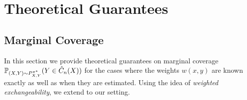 

\section{Theoretical Guarantees}\label{sec:theory}
\subsection{Marginal Coverage}

In this section we provide theoretical guarantees on marginal coverage $\mathbb{P}_{(X,Y)\sim P^{\pi^*}_{X,Y}}(Y \in \hat{C}_n(X))$ for the cases where the weights $w(x, y)$ are known exactly as well as when they are estimated. Using the idea of \textit{weighted exchangeability}, we extend \cite[Theorem 2]{tibshirani2020conformal} to our setting. 

